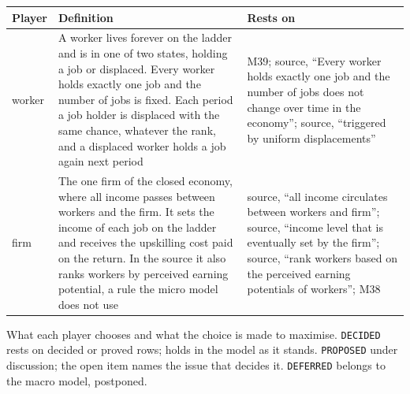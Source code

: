 \documentclass[10pt]{article}
\begin{document}
\begin{longtable}{>{\raggedright\arraybackslash}p{3.0cm} >{\raggedright\arraybackslash}p{12.5cm} >{\raggedright\arraybackslash}p{8.0cm}}
\toprule Player & Definition & Rests on \\ \midrule \endhead
worker & A worker lives forever on the ladder and is in one of two states, holding a job or displaced. Every worker holds exactly one job and the number of jobs is fixed. Each period a job holder is displaced with the same chance, whatever the rank, and a displaced worker holds a job again next period & M39; source, ``Every worker holds exactly one job and the number of jobs does not change over time in the economy''; source, ``triggered by uniform displacements'' \\ \midrule
firm & The one firm of the closed economy, where all income passes between workers and the firm. It sets the income of each job on the ladder and receives the upskilling cost paid on the return. In the source it also ranks workers by perceived earning potential, a rule the micro model does not use & source, ``all income circulates between workers and firm''; source, ``income level that is eventually set by the firm''; source, ``rank workers based on the perceived earning potentials of workers''; M38 \\ \midrule
\end{longtable}

What each player chooses and what the choice is made to maximise. \texttt{DECIDED} rests on decided or proved rows; holds in the model as it stands. \texttt{PROPOSED} under discussion; the open item names the issue that decides it. \texttt{DEFERRED} belongs to the macro model, postponed.
\end{document}

